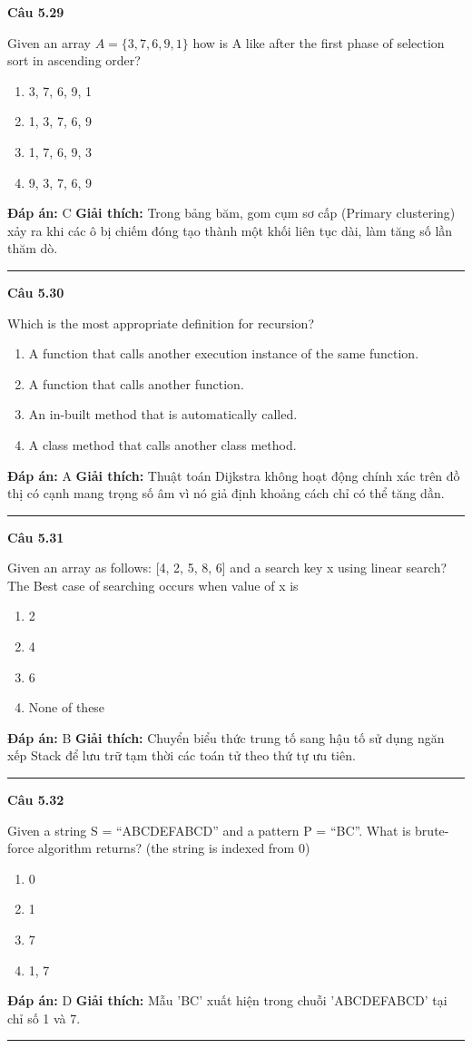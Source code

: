 \documentclass[11pt,a4paper]{article}
\newenvironment{question}[1]{%
  \par\vspace{1em}\noindent\textbf{\large Câu #1}\par\vspace{0.4em}
}{%
  \par\vspace{1em}\hrule\vspace{0.6em}
}
\newenvironment{choices}{%
  \begin{enumerate}[label=\textbf{\Alph*.},leftmargin=2.2em,itemsep=2pt,topsep=3pt]
}{%
  \end{enumerate}
}
\newcommand{\choice}{\item}
\begin{document}
\begin{question}{5.29}
Given an array $A = \{3, 7, 6, 9, 1\}$ how is A like after the first phase of selection sort in ascending order?
\begin{choices}
\choice 3, 7, 6, 9, 1
\choice 1, 3, 7, 6, 9
\choice 1, 7, 6, 9, 3
\choice 9, 3, 7, 6, 9
\end{choices}
\textbf{Đáp án:} C
\textbf{Giải thích:} Trong bảng băm, gom cụm sơ cấp (Primary clustering) xảy ra khi các ô bị chiếm đóng tạo thành một khối liên tục dài, làm tăng số lần thăm dò.
\end{question}

\begin{question}{5.30}
Which is the most appropriate definition for recursion?
\begin{choices}
\choice A function that calls another execution instance of the same function.
\choice A function that calls another function.
\choice An in-built method that is automatically called.
\choice A class method that calls another class method.
\end{choices}
\textbf{Đáp án:} A
\textbf{Giải thích:} Thuật toán Dijkstra không hoạt động chính xác trên đồ thị có cạnh mang trọng số âm vì nó giả định khoảng cách chỉ có thể tăng dần.
\end{question}

\begin{question}{5.31}
Given an array as follows: [4, 2, 5, 8, 6] and a search key x using linear search? The Best case of searching occurs when value of x is
\begin{choices}
\choice 2
\choice 4
\choice 6
\choice None of these
\end{choices}
\textbf{Đáp án:} B
\textbf{Giải thích:} Chuyển biểu thức trung tố sang hậu tố sử dụng ngăn xếp Stack để lưu trữ tạm thời các toán tử theo thứ tự ưu tiên.
\end{question}

\begin{question}{5.32}
Given a string S = ``ABCDEFABCD'' and a pattern P = ``BC''. What is brute-force algorithm returns? (the string is indexed from 0)
\begin{choices}
\choice 0
\choice 1
\choice 7
\choice 1, 7
\end{choices}
\textbf{Đáp án:} D
\textbf{Giải thích:} Mẫu 'BC' xuất hiện trong chuỗi 'ABCDEFABCD' tại chỉ số 1 và 7.
\end{question}
\end{document}
